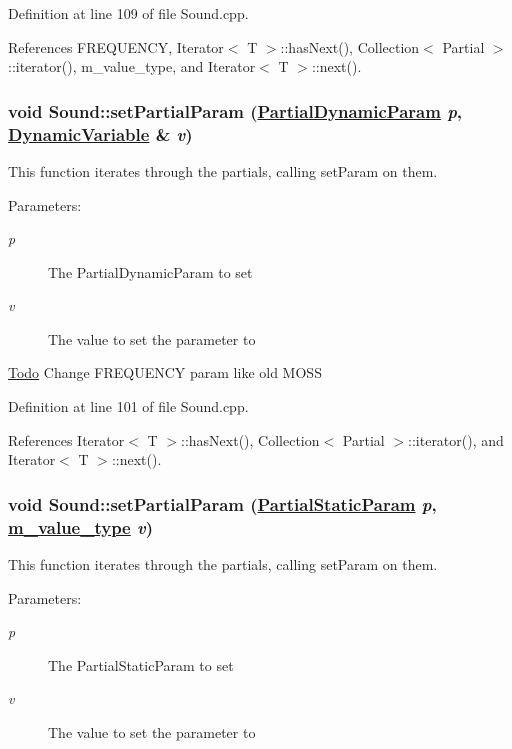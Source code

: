 Definition at line 109 of file Sound.cpp.

References FREQUENCY, Iterator$<$ T $>$::has\-Next(), Collection$<$ Partial $>$::iterator(), m\_\-value\_\-type, and Iterator$<$ T $>$::next().\hypertarget{classSound_a3}{
\subsubsection[setPartialParam]{\setlength{\rightskip}{0pt plus 5cm}void Sound::set\-Partial\-Param (\hyperlink{Partial_8h_a20}{Partial\-Dynamic\-Param} {\em p}, \hyperlink{classDynamicVariable}{Dynamic\-Variable} \& {\em v})}}
\label{classSound_a3}


This function iterates through the partials, calling set\-Param on them. \begin{Desc}
\item[Parameters:]
\begin{description}
\item[{\em p}]The Partial\-Dynamic\-Param to set \item[{\em v}]The value to set the parameter to \end{description}
\end{Desc}
\begin{Desc}
\item[\hyperlink{todo__todo000010}{Todo}]Change FREQUENCY param like old MOSS \end{Desc}


Definition at line 101 of file Sound.cpp.

References Iterator$<$ T $>$::has\-Next(), Collection$<$ Partial $>$::iterator(), and Iterator$<$ T $>$::next().\hypertarget{classSound_a2}{
\subsubsection[setPartialParam]{\setlength{\rightskip}{0pt plus 5cm}void Sound::set\-Partial\-Param (\hyperlink{Partial_8h_a19}{Partial\-Static\-Param} {\em p}, \hyperlink{Types_8h_a3}{m\_\-value\_\-type} {\em v})}}
\label{classSound_a2}


This function iterates through the partials, calling set\-Param on them. \begin{Desc}
\item[Parameters:]
\begin{description}
\item[{\em p}]The Partial\-Static\-Param to set \item[{\em v}]The value to set the parameter to \end{description}
\end{Desc}


